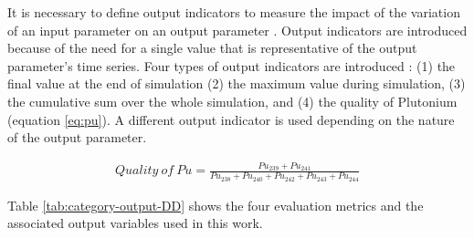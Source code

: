 It is necessary to define output indicators to measure the 
impact of the variation of an input parameter on an output 
parameter \cite{noauthor_effects_2017}. 
Output indicators are introduced because of the need for a single value that 
is representative of the output parameter's time series.  
Four types of output indicators are introduced 
\cite{noauthor_effects_2017}: 
(1) the final value at the end of simulation
(2) the maximum value during simulation,  
(3) the cumulative sum over the whole simulation, and 
(4) the quality of Plutonium (equation \ref{eq:pu}). 
A different output indicator is used depending on 
the nature of the output parameter.

\begin{align}
    \label{eq:pu}
Quality\ of\ Pu = \frac{Pu_{239}+Pu_{241}}{Pu_{238}+Pu_{240}+Pu_{242}+Pu_{243}+Pu_{244}}
\end{align}

Table \ref{tab:category-output-DD} shows the four evaluation 
metrics and the associated output variables used in this work. 

